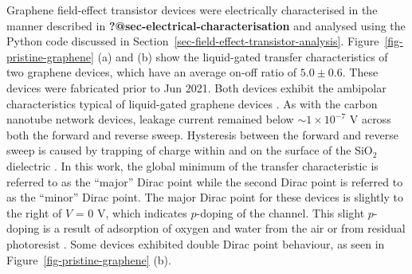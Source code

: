 \documentclass[
  a4paper,
]{scrbook}
\begin{document}
Graphene field-effect transistor devices were electrically characterised
in the manner described in \textbf{?@sec-electrical-characterisation}
and analysed using the Python code discussed in
Section~\ref{sec-field-effect-transistor-analysis}.
Figure~\ref{fig-pristine-graphene} (a) and (b) show the liquid-gated
transfer characteristics of two graphene devices, which have an average
on-off ratio of \(5.0 \pm 0.6\). These devices were fabricated prior to
Jun 2021. Both devices exhibit the ambipolar characteristics typical of
liquid-gated graphene devices
\autocite{Heller2009a,Heller2010,Xia2010,Kireev2017}. As with the carbon
nanotube network devices, leakage current remained below
\(\sim 1 \times 10^{-7}\) V across both the forward and reverse sweep.
Hysteresis between the forward and reverse sweep is caused by trapping
of charge within and on the surface of the SiO\(_{2}\) dielectric
\autocite{Bartolomeo2011}. In this work, the global minimum of the
transfer characteristic is referred to as the ``major'' Dirac point
while the second Dirac point is referred to as the ``minor'' Dirac
point. The major Dirac point for these devices is slightly to the right
of \(V\) = 0 V, which indicates \(p\)-doping of the channel. This slight
\(p\)-doping is a result of adsorption of oxygen and water from the air
or from residual photoresist \autocite{Cheng2011,Shin2012,Kireev2017}.
Some devices exhibited double Dirac point behaviour, as seen in
Figure~\ref{fig-pristine-graphene} (b).
\end{document}
